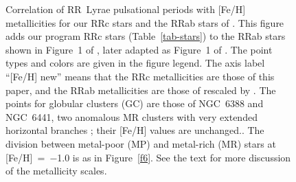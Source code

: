 \documentclass[preprint]{aastex6}
\begin{document}
\clearpage
\begin{figure}
\caption{\label{f7}
\footnotesize
   Correlation of RR~Lyrae pulsational periods with [Fe/H] 
   metallicities for our RRc stars and the RRab stars of 
   \cite{layden94,layden95b}.  
   This figure adds our program RRc stars (Table~\ref{tab-stars}) to the 
   RRab stars shown in Figure~1 of \cite{layden95b}, later adapted
   as Figure~1 of \cite{chadid17}.
   The point types and colors are given in the figure legend.
   The axis label ``[Fe/H] new'' means that the RRc metallicities are
   those of this paper, and the RRab metallicities are those of
   \cite{layden94} rescaled by \cite{chadid17}.
   The points for globular clusters (GC) are those of NGC~6388 and NGC~6441,
   two anomalous MR clusters with very extended horizontal branches
   \citep{rich97}; their [Fe/H] values are unchanged..
   The division between metal-poor (MP) and metal-rich (MR) stars at
   [Fe/H]~=~$-$1.0 is as in Figure~\ref{f6}.
   See the text for more discussion of the metallicity scales.
}
\end{figure}




\end{document}
